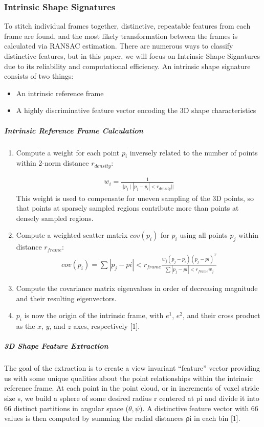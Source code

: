 \documentclass[12pt]{drexelthesis}
\begin{document}
\subsubsection{Intrinsic Shape Signatures}
To stitch individual frames together, distinctive, repeatable features from each frame are found, and the most likely transformation between the frames is calculated via RANSAC estimation. There are numerous ways to classify distinctive features, but in this paper, we will focus on Intrinsic Shape Signatures due to its reliability and computational efficiency.
An intrinsic shape signature consists of two things:
\begin{itemize}
	\item An intrinsic reference frame
	\item A highly discriminative feature vector encoding the 3D shape characteristics
\end{itemize}
\subparagraph{Intrinsic Reference Frame Calculation}
\begin{enumerate}
	\item Compute a weight for each point $p_{i}$ inversely related to the number of points within 2-norm distance $r_{density}$:

		\begin{gather*}
		w_{i}=  \frac{1}{||p_{j} \mid |p_{j}-p_{i}| < r_{density}||}
		\end{gather*}
		This weight is used to compensate for uneven sampling of the 3D points, so that points at sparsely sampled regions contribute more than points at densely sampled regions. 

	\item Compute a weighted scatter matrix $cov(p_{i})$ for $p_{i}$ using all points $p_{j}$ within distance $r_{frame}$:
		\begin{gather*}
		cov(p_{i})= \sum{|p_{j}-p{i}| < r_{frame}}\frac{w_{j}(p_{j}-p_{i})(p_{j}-p{i})^{T}}{ \sum{|p_{j}-p{i}| < r_{frame}}w_{j}}
		\end{gather*}
	\item Compute the covariance matrix eigenvalues in order of decreasing magnitude and their resulting eigenvectors.
	\item $p_{i}$ is now the origin of the intrinsic frame, with $e^{1}$, $e^{2}$, and their cross product as the $x$, $y$, and $z$ axes, respectively [1].
\end{enumerate}

\subparagraph{3D Shape Feature Extraction}
The goal of the extraction is to create a view invariant “feature” vector providing us with some unique qualities about the point relationships within the intrinsic reference frame. At each point in the point cloud, or in increments of voxel stride size s, we build a sphere of some desired radius r centered at pi and divide it into 66 distinct partitions in angular space ($\theta, \psi$). A distinctive feature vector with 66 values is then computed by summing the radial distances ρi in each bin [1].
\end{document}
